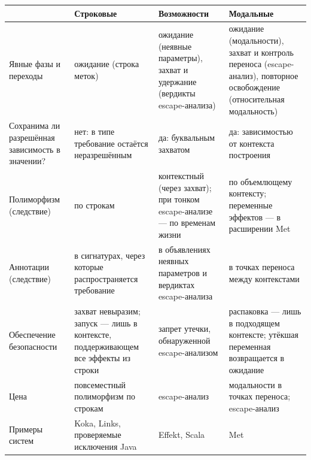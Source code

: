 \documentclass{ProcISPRAS}
\begin{document}
\begin{table}[!tbp]
  \label{tbl:compare}
  \centering
  \footnotesize
  \begin{tabular}{>{\raggedright\arraybackslash}p{2.0cm}>{\raggedright\arraybackslash}p{2.7cm}>{\raggedright\arraybackslash}p{2.7cm}>{\raggedright\arraybackslash}p{2.7cm}}
  \toprule
  & \textbf{Строковые} & \textbf{Возможности} & \textbf{Модальные} \\
  \midrule
  Явные фазы и переходы & ожидание (строка меток) & ожидание (неявные параметры), захват и удержание (вердикты escape-анализа) & ожидание (модальности), захват и контроль переноса (escape-анализ), повторное освобождение (относительная модальность) \\
  Сохранима ли разрешённая зависимость в значении? & нет: в типе требование остаётся неразрешённым & да: буквальным захватом & да: зависимостью от контекста построения \\
  Полиморфизм (следствие) & по строкам & контекстный (через захват); при тонком escape-анализе --- по временам жизни & по объемлющему контексту; переменные эффектов --- в расширении Met \\
  Аннотации (следствие) & в сигнатурах, через которые распространяется требование & в объявлениях неявных параметров и вердиктах escape-анализа & в точках переноса между контекстами \\
  Обеспечение безопасности & захват невыразим; запуск --- лишь в контексте, поддерживающем все эффекты из строки & запрет утечки, обнаруженной escape-анализом & распаковка --- лишь в подходящем контексте; утёкшая переменная возвращается в ожидание \\
  Цена & повсеместный полиморфизм по строкам & escape-анализ & модальности в точках переноса; escape-анализ \\
  Примеры систем & Koka, Links, проверяемые исключения Java & Effekt, Scala & Met~\cite{tang2025modal} \\
  \bottomrule
  \end{tabular}
\end{table}
\end{document}
